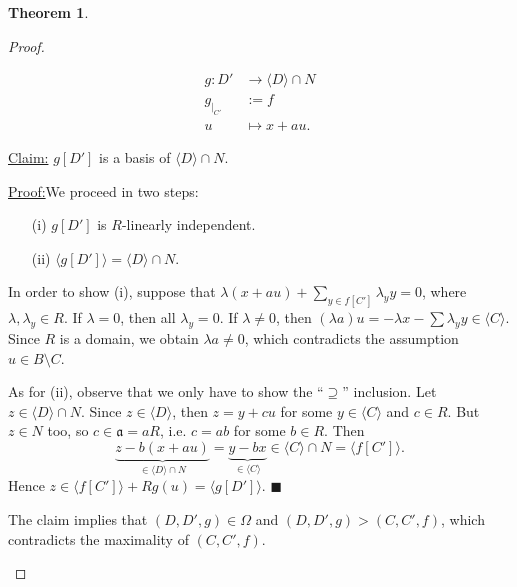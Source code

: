 \documentclass[12pt,a4paper]{report}
\theoremstyle{definition}
\newtheorem{theorem}{Theorem}[chapter] %
\theoremstyle{num.custom-title}
\newenvironment{claim}[1]{\par\noindent\underline{Claim#1:}\space}{} %
\newenvironment{claimproof}[1]{\par\noindent\underline{Proof:}\space#1}{\leavevmode\unskip\penalty9999 \hbox{}\nobreak\hfill\quad\hbox{$\blacksquare$}} %
\DeclareMathOperator{\sm}{\setminus}
\begin{document}
\begin{theorem}
\begin{proof}
\begin{enumerate}
\begin{align*}
g \colon D' &\to \langle D \rangle \cap N \\
g_{|_{C'}} &:= f \\
u &\mapsto x + au.
\end{align*}
\begin{claim}{}
$g[D']$ is a basis of $\langle D \rangle \cap N$.
\begin{claimproof}
We proceed in two steps:
\begin{enumerate}
\item[(i)] $g[D']$ is $R$-linearly independent.
\item[(ii)] $\langle g[D'] \rangle = \langle D \rangle \cap N$.
\end{enumerate}
In order to show (i), suppose that $\lambda(x+au) + \sum_{y \in f[C']} \lambda_y y =0$, where $\lambda,\lambda_y \in R$. If $\lambda = 0$, then all $\lambda_y = 0$. If $\lambda \neq 0$, then $(\lambda a) u = -\lambda x - \sum \lambda_y y \in \langle C \rangle$. Since $R$ is a domain, we obtain $\lambda a \neq 0$, which contradicts the assumption $u \in B \sm C$.

As for (ii), observe that we only have to show the ``$\supseteq$'' inclusion. Let $z \in \langle D \rangle \cap N$. Since $z \in \langle D \rangle$, then $z = y+cu$ for some $y \in \langle C \rangle$ and $c \in R$. But $z \in N$ too, so $c \in \mathfrak{a} = aR$, i.e. $c=ab$ for some $b \in R$. Then 
\[
\underbrace{z-b(x+au)}_{\in \langle D \rangle \cap N} = \underbrace{y-bx}_{\in \langle C \rangle} \in \langle C \rangle \cap N = \langle f[C'] \rangle.
\]
Hence $z \in \langle f[C'] \rangle + R g(u) = \langle g[D'] \rangle$.
\end{claimproof}
\end{claim}

The claim implies that $(D,D',g) \in \Omega$ and $(D,D',g) > (C,C',f)$, which contradicts the maximality of $(C,C',f)$.
\end{enumerate}
\end{proof}
\end{theorem}
\end{document}
